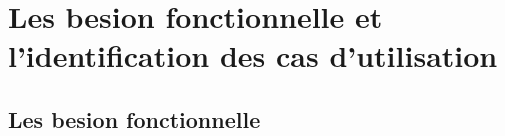 \documentclass[a4paper,12p]{thesis}
\begin{document}
    \section{Les besion fonctionnelle et l'identification des cas d'utilisation}
    \subsection{Les besion fonctionnelle}



    \lipsum
\end{document}
